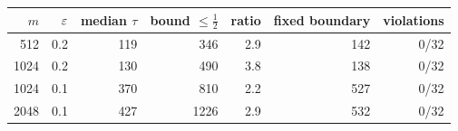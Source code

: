 \begin{tabular}{rrrrrrr}
\toprule
$m$ & $\varepsilon$ & median $\tau$ & bound $\le\frac12$ & ratio & fixed boundary & violations \\
\midrule
512 & 0.2 & 119 & 346 & 2.9 & 142 & 0/32 \\
1024 & 0.2 & 130 & 490 & 3.8 & 138 & 0/32 \\
1024 & 0.1 & 370 & 810 & 2.2 & 527 & 0/32 \\
2048 & 0.1 & 427 & 1226 & 2.9 & 532 & 0/32 \\
\bottomrule
\end{tabular}
